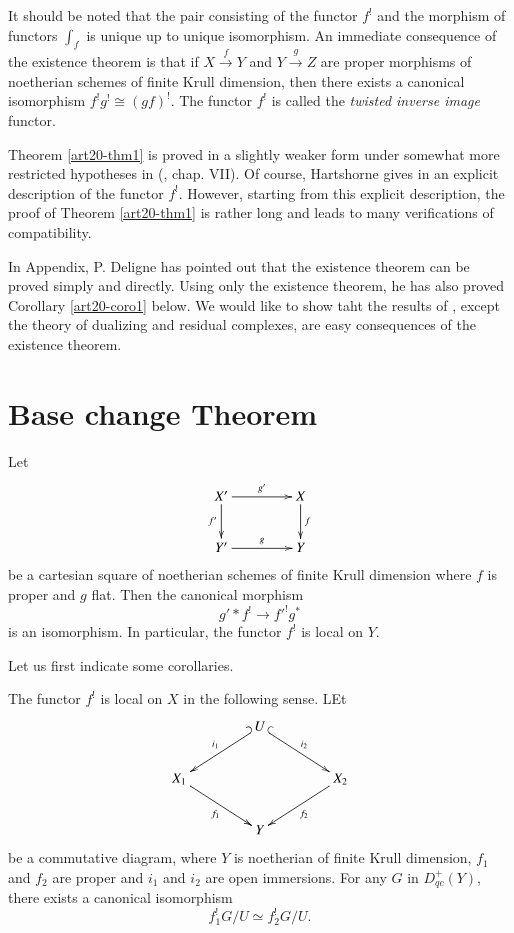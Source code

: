 It should be noted that the pair consisting of the functor $f^{!}$ and the morphism of functors $\int_{f}$ is unique up to unique isomorphism. An immediate consequence of the existence theorem is that if $X\xrightarrow{f}Y$ and $Y\xrightarrow{g}Z$ are proper morphisms of noetherian schemes of finite Krull dimension, then there exists a canonical isomorphism $f^{!}g^{!}\cong (gf)^{!}$. The functor $f^{!}$ is called the {\em twisted inverse image} functor.

Theorem \ref{art20-thm1} is proved in a slightly weaker form under somewhat more restricted hypotheses in (\cite{art20-key1}, chap. VII). Of course, Hartshorne gives in \cite{art20-key1} an explicit description of the functor $f^{!}$. However, starting from this explicit description, the proof of Theorem \ref{art20-thm1} is rather long and leads to many verifications of compatibility.

In \cite{art20-key1} Appendix, P. Deligne has pointed out that the existence theorem can be proved simply and directly. Using only the existence theorem, he has also proved Corollary \ref{art20-coro1} below. We would like to show taht the results of \cite{art20-key1}, except the theory of dualizing and residual complexes, are easy consequences of the existence theorem.

\section{Base change Theorem}\label{art20-sec2}

\setcounter{theorem}{1}
\begin{theorem}\label{ART20-THM2}
Let
\[
\xymatrix@C=1.5cm{
X'\ar[d]_-{f'}\ar[r]^-{g'} & X\ar[d]^-{f}\\
Y'\ar[r]^-{g} & Y
}
\]
be a cartesian square of noetherian schemes of finite Krull dimension where $f$ is proper and $g$ flat. Then the canonical morphism
\begin{equation}
g'\ast f^{!}\to {f'}^{!}g^{*}\label{art20-2.1}
\end{equation}\pageoriginale
is an isomorphism. In particular, the functor $f^{!}$ is local on $Y$.
\end{theorem}

Let us first indicate some corollaries.

\begin{corollary}\label{art20-coro1}
The functor $f^{!}$ is local on $X$ in the following sense. LEt
\[
\xymatrix@C=1.5cm{
 & U\ar@{_(->}[dl]_-{i_{1}}\ar@{^(->}[dr]^-{i_{2}} & \\
X_{1}\ar[dr]_-{f_{1}} & & X_{2}\ar[dl]^-{f_{2}}\\
 & Y & 
}
\]
be a commutative diagram, where $Y$ is noetherian of finite Krull dimension, $f_{1}$ and $f_{2}$ are proper and $i_{1}$ and $i_{2}$ are open immersions. For any $G$ in $D^{+}_{qc}(Y)$, there exists a canonical isomorphism
$$
f^{!}_{1}G/U\simeq f^{!}_{2}G/U.
$$
\end{corollary}

